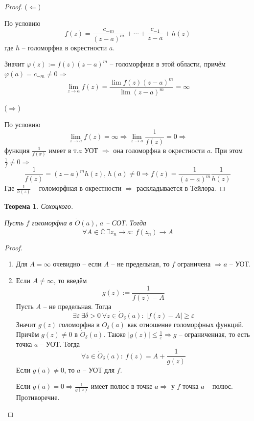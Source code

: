 \documentclass[a4paper,12pt]{article}
\renewcommand{\phi}{\ensuremath{\varphi}}
\renewcommand{\leq}{\ensuremath{\leqslant}}
\renewcommand{\geq}{\ensuremath{\geqslant}}
\theoremstyle{plain}
\newtheorem{theorem}{Теорема}[section]
\theoremstyle{definition}
\theoremstyle{remark}
\begin{document}
\begin{proof}
	($\Leftarrow$)

	По условию
	\[
		f(z) = \frac{c_{-m}}{(z - a)^m} + \cdots + \frac{c_{-1}}{z -a} + h(z)
	\]
	где $h$ -- голоморфна в окрестности $a$.

	Значит $\phi(z) := f(z)(z - a)^m$ -- голоморфная в этой области, причём $\phi(a) = c_{-m} \neq 0 \Rightarrow$
	\[
		\lim_{z \to a}f(z) = \frac{\lim f(z)(z - a)^m}{\lim(z - a)^m} = \infty
	\]

	($\Rightarrow$)

	По условию
	\[
		\lim_{z \to a} f(z) = \infty \Rightarrow \lim_{z \to a}\frac{1}{f(z)} = 0 \Rightarrow
	\]
	функция $\frac{1}{f(x)}$ имеет в т.$a$ УОТ $\Rightarrow$ она голоморфна в окрестности $a$. При этом $\frac{1}{f} \neq 0 \Rightarrow$
	\[
		\frac{1}{f(z)} = (z - a)^mh(z),\, h(a) \neq 0 \Rightarrow f(z) = \frac{1}{(z - a)^m}\frac{1}{h(z)}
	\]
	Где $\frac{1}{h(z)}$ -- голоморфная в окрестности $\Rightarrow$ раскладывается в Тейлора.
\end{proof}

\begin{theorem}
	Сохоцкого.

	Пусть $f$ голоморфна в $\dot{O}(a),\, a$ -- СОТ. Тогда
	\[
		\forall A \in \overline{\mathbb{C}} \: \exists z_n \to a :\: f(z_n) \to A
	\]
\end{theorem}

\begin{proof}
	\begin{enumerate}
		\item Для $A = \infty$ очевидно -- если $A$ -- не предельная, то $f$ ограничена $\Rightarrow a$ -- УОТ.
		\item Если $A \neq \infty$, то введём
		      \[
			      g(z) := \frac{1}{f(z) - A}
		      \]
		      Пусть $A$ -- не предельная. Тогда
		      \[
			      \exists \varepsilon \: \exists \delta > 0 \: \forall z \in \dot{O}_\delta(a) :\: \vert f(z) - A\vert \geq \varepsilon
		      \]
		      Значит $g(z)$ голоморфна в $\dot{O}_\delta(a)$ как отношение голоморфных функций. Причём $g(z) \neq 0$ в $\dot{O}_\delta(a)$. Также $\vert g(z)\vert \leq \frac{1}{\varepsilon} \Rightarrow g$ -- ограниченная, то есть точка $a$ -- УОТ. Тогда
		      \[
			      \forall z \in \dot{O}_\delta(a) :\: f(z) = A + \frac{1}{g(z)}
		      \]
		      Если $g(a) \neq 0$, то $a$ -- УОТ для $f$.

		      Если $g(a) = 0 \Rightarrow \frac{1}{g(z)}$ имеет полюс в точке $a \Rightarrow$ у $f$ точка $a$ -- полюс. Противоречие.
	\end{enumerate}
\end{proof}
\end{document}
